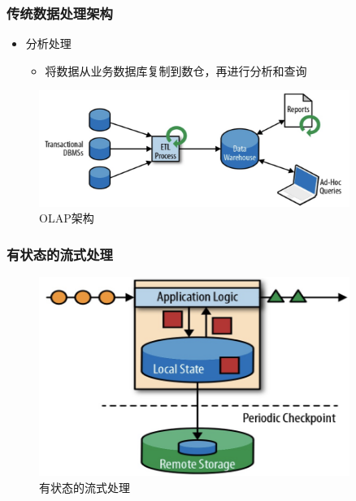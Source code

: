 \documentclass{beamer}
\begin{document}
  \begin{frame}
    \frametitle{传统数据处理架构}
  
    \begin{itemize}
      \item 分析处理
        \begin{itemize}
          \item 将数据从业务数据库复制到数仓，再进行分析和查询
        \end{itemize}
    \end{itemize}

    \begin{figure}
      \centering
      \includegraphics[width=0.9\textwidth]{image5.png}
      \caption{OLAP架构}
    \end{figure}
  
  \end{frame}

  \begin{frame}
    \frametitle{有状态的流式处理}

    \begin{figure}
      \centering
      \includegraphics[width=0.9\textwidth]{image6.png}
      \caption{有状态的流式处理}
    \end{figure}
  
  \end{frame}
\end{document}

